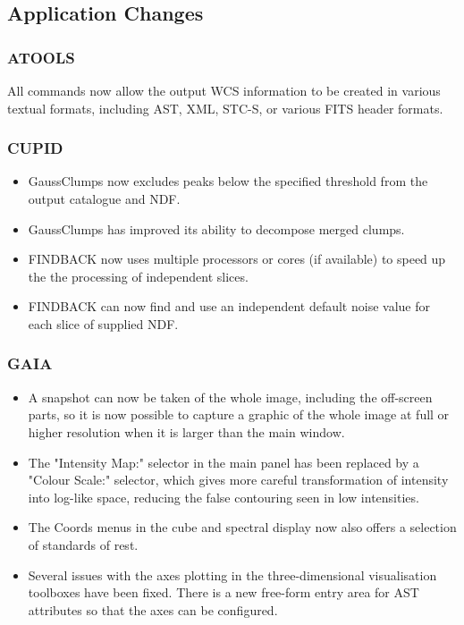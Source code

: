 \subsection{Application Changes}

\subsubsection{ATOOLS}
All commands now allow the output WCS information to be created in various textual formats, including AST, XML, STC-S, or various FITS header formats.

\subsubsection{CUPID}
\begin{itemize}
\item {}GaussClumps now excludes peaks below the specified threshold from the output catalogue and NDF.
\item {}GaussClumps has improved its ability to decompose merged clumps.
\item FINDBACK now uses multiple processors or cores (if available) to speed up the the processing of independent slices.
\item FINDBACK can now find and use an independent default noise value for each slice of supplied NDF.
\end{itemize}

\subsubsection{GAIA}
\begin{itemize}
\item A snapshot can now be taken of the whole image, including the off-screen parts, so it is now possible to capture a graphic of the whole image at full or higher resolution when it is larger than the main window.
\item The "Intensity Map:" selector in the main panel has been replaced by a "Colour Scale:" selector, which gives more careful transformation of intensity into log-like space, reducing the false contouring seen in low intensities.
\item The Coords menus in the cube and spectral display now also offers a selection of standards of rest.
\item Several issues with the axes plotting in the three-dimensional visualisation toolboxes have been fixed. There is a new free-form entry area for AST attributes so that the axes can be configured.
\end{itemize}

